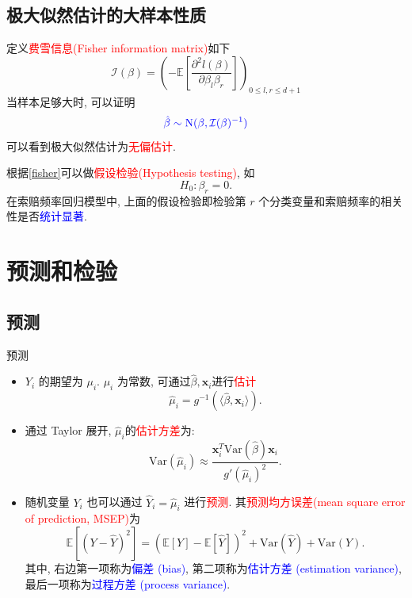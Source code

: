\documentclass[professionalfont]{beamer}
\def\E{{\mathbb E}}  %
\def\bx{\boldsymbol{x}}
\newcommand{\red}[1]{\textcolor{red}{#1}}
\newcommand{\blue}[1]{\textcolor{blue}{#1}}
\begin{document}
\subsection{极大似然估计的大样本性质}
\begin{frame}
定义\red{费雪信息(Fisher information matrix)}如下
\begin{equation}
\mathcal{I}(\beta)=\left(-\E\left[\frac{\partial^2l(\beta)}{\partial\beta_l\beta_r}\right]\right)_{0\le l,r\le d+1}
\end{equation}
当样本足够大时, 可以证明
\begin{equation}\label{fisher}
\blue{\hat{\beta}\sim \text{N}(\beta, \mathcal{I}(\beta)^{-1})}
\end{equation}
可以看到极大似然估计为\red{无偏估计}. 
\end{frame}
\begin{frame}
根据\eqref{fisher}可以做\red{假设检验(Hypothesis testing)}, 如$$H_0: \beta_r=0.$$ 
在索赔频率回归模型中, 上面的假设检验即检验第 $r$ 个分类变量和索赔频率的相关性是否\blue{统计显著}.
\end{frame}
\section{预测和检验}
\subsection{预测}
\begin{frame}{预测}
	\begin{itemize}
	\item 	$Y_i$ 的期望为 $\mu_i$. $\mu_i$ 为常数, 可通过$\hat{\beta}, \bx_i$进行\red{估计}
	$$\hat{\mu}_i=g^{-1}(\langle\hat{\beta},\bx_i\rangle).$$
	\item 通过 Taylor 展开, $\hat{\mu}_i$的\red{估计方差}为:
	\begin{equation}\label{delta2}
	\text{Var}(\hat{\mu}_i)\approx\frac{\bx_i^T\text{Var}(\hat{\beta})\bx_i}{g'(\hat{\mu}_i)^2}.
	\end{equation}
	\item 随机变量 $Y_i$ 也可以通过 $\hat{Y}_i=\hat{\mu}_i$ 进行\red{预测}. 其\red{预测均方误差(mean square error of prediction, MSEP)}为
	\begin{equation}\label{MSEP}
	\E\left[\left(Y-\hat{Y}\right)^2\right]=\left(\E[Y]-\E[\hat{Y}]\right)^2+\text{Var}(\hat{Y})+\text{Var}(Y).
	\end{equation}
	其中, 右边第一项称为\blue{偏差 (bias)}, 第二项称为\blue{估计方差 (estimation variance)}, 最后一项称为\blue{过程方差 (process variance)}.
	\end{itemize}
\end{frame}
\end{document}

